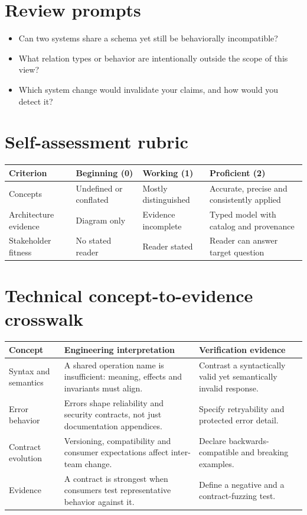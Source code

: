 \documentclass[10pt,letterpaper]{article}
\begin{document}
\section{Review prompts}
\begin{itemize}
\item Can two systems share a schema yet still be behaviorally incompatible?
\item What relation types or behavior are intentionally outside the scope of this view?
\item Which system change would invalidate your claims, and how would you detect it?
\end{itemize}
\section{Self-assessment rubric}
\small
\begin{tabularx}{\linewidth}{@{}YYYY@{}}
\toprule
\textbf{Criterion} & \textbf{Beginning (0)} & \textbf{Working (1)} & \textbf{Proficient (2)} \\
\midrule
Concepts & Undefined or conflated & Mostly distinguished & Accurate, precise and consistently applied \\
Architecture evidence & Diagram only & Evidence incomplete & Typed model with catalog and provenance \\
Stakeholder fitness & No stated reader & Reader stated & Reader can answer target question \\
\bottomrule
\end{tabularx}
\normalsize
\section{Technical concept-to-evidence crosswalk}
\small
\begin{tabularx}{\linewidth}{@{}YYY@{}}
\toprule
\textbf{Concept} & \textbf{Engineering interpretation} & \textbf{Verification evidence} \\
\midrule
Syntax and semantics & A shared operation name is insufficient: meaning, effects and invariants must align. & Contrast a syntactically valid yet semantically invalid response. \\
Error behavior & Errors shape reliability and security contracts, not just documentation appendices. & Specify retryability and protected error detail. \\
Contract evolution & Versioning, compatibility and consumer expectations affect inter-team change. & Declare backwards-compatible and breaking examples. \\
Evidence & A contract is strongest when consumers test representative behavior against it. & Define a negative and a contract-fuzzing test. \\
\bottomrule
\end{tabularx}
\normalsize
\end{document}
